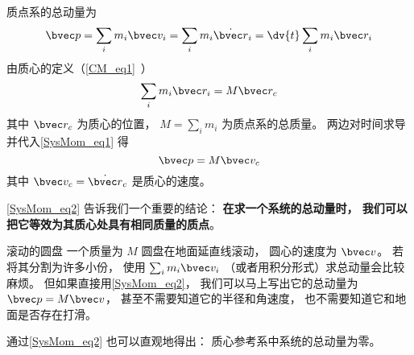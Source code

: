 

质点系的总动量为
\begin{equation}\label{SysMom_eq1}
\bvec p = \sum_i m_i \bvec v_i = \sum_i m_i \dot{\bvec r}_i = \dv{t}  \sum_i m_i \bvec r_i
\end{equation}
由质心的定义（\autoref{CM_eq1}~） 
\begin{equation}
\sum_i m_i \bvec r_i = M \bvec r_c
\end{equation}
其中 $\bvec r_c$ 为质心的位置， $M = \sum_i m_i$ 为质点系的总质量。 两边对时间求导并代入\autoref{SysMom_eq1} 得
\begin{equation}\label{SysMom_eq2}
\bvec p = M\bvec v_c
\end{equation}
其中 $\bvec v_c = \dot{\bvec r}_c$ 是质心的速度。

\autoref{SysMom_eq2} 告诉我们一个重要的结论： \textbf{在求一个系统的总动量时， 我们可以把它等效为其质心处具有相同质量的质点}。

\begin{example}{滚动的圆盘}
一个质量为 $M$ 圆盘在地面延直线滚动， 圆心的速度为 $\bvec v$。 若将其分割为许多小份， 使用 $\sum_i m_i \bvec v_i$ （或者用积分形式）求总动量会比较麻烦。 但如果直接用\autoref{SysMom_eq2}， 我们可以马上写出它的总动量为 $\bvec p = M\bvec v$， 甚至不需要知道它的半径和角速度， 也不需要知道它和地面是否存在打滑。
\end{example}

通过\autoref{SysMom_eq2} 也可以直观地得出： 质心参考系中系统的总动量为零。
